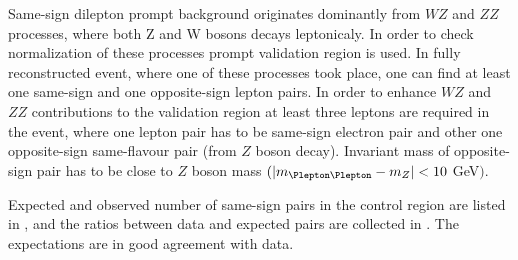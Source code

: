 Same-sign dilepton prompt background originates dominantly from $WZ$ and $ZZ$ processes, where both Z and W bosons decays leptonicaly.
In order to check normalization of these processes prompt validation region is used.
In fully reconstructed event, where one of these processes took place, one can find at least one same-sign and one opposite-sign lepton pairs.
In order to enhance $WZ$ and $ZZ$ contributions to the validation region at least three leptons are required in the event, where one lepton pair
has to be same-sign electron pair and other one opposite-sign same-flavour pair (from $Z$ boson decay). 
Invariant mass of opposite-sign pair has to be close to $Z$ boson mass $(|m_{\Plepton\Plepton} - m_{Z}| < 10$ GeV$)$.

Expected and observed number of same-sign pairs in the control region are listed in , 
and the ratios between data and expected pairs are collected in . 
The expectations are in good agreement with data.

\begin{table*}[htbp]
\caption{Expected and observed numbers of pairs for various cuts on the dilepton invariant mass. The uncertainties shown are the quadratic sum of the statistical and systematic uncertainties.}
\begin{center}
\end{center}
\label{tab:promptCR_yields}
\end{table*}


